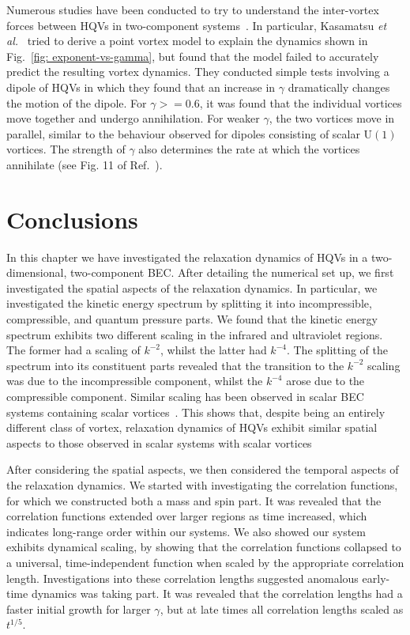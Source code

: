 Numerous studies have been conducted to try to understand the inter-vortex
forces between HQVs in two-component systems~\cite{Eto2011, Kasamatsu2016}.
In particular, Kasamatsu \textit{et al.}~\cite{Kasamatsu2016} tried to derive a
point vortex model to explain the dynamics shown in
Fig.~\ref{fig: exponent-vs-gamma}, but found that the model failed to accurately
predict the resulting vortex dynamics.
They conducted simple tests involving a dipole of HQVs in which they found that
an increase in \(\gamma \) dramatically changes the motion of the dipole.
For \(\gamma>=0.6\), it was found that the individual vortices move together and
undergo annihilation.
For weaker \(\gamma \), the two vortices move in parallel, similar to
the behaviour observed for dipoles consisting of scalar \(\mathrm{U}(1)\)
vortices.
The strength of \(\gamma \) also determines the rate at which the vortices
annihilate (see Fig. 11 of Ref.~\cite{Kasamatsu2016}).

\section{Conclusions}
In this chapter we have investigated the relaxation dynamics of HQVs in a
two-dimensional, two-component BEC\@.
After detailing the numerical set up, we first investigated the spatial aspects
of the relaxation dynamics.
In particular, we investigated the kinetic energy spectrum by splitting it
into incompressible, compressible, and quantum pressure parts.
We found that the kinetic energy spectrum exhibits two different scaling in the
infrared and ultraviolet regions.
The former had a scaling of \(k^{-2}\), whilst the latter had \(k^{-4}\).
The splitting of the spectrum into its constituent parts revealed that the
transition to the \(k^{-2}\) scaling was due to the incompressible component,
whilst the \(k^{-4}\) arose due to the compressible component.
Similar scaling has been observed in scalar BEC systems containing scalar
vortices~\cite{Nowak2012}.
This shows that, despite being an entirely different class of vortex, relaxation
dynamics of HQVs exhibit similar spatial aspects to those observed in scalar
systems with scalar vortices

After considering the spatial aspects, we then considered the temporal aspects
of the relaxation dynamics.
We started with investigating the correlation functions, for which we
constructed both a mass and spin part.
It was revealed that the correlation functions extended over larger regions as
time increased, which indicates long-range order within our systems.
We also showed our system exhibits dynamical scaling, by showing that the
correlation functions collapsed to a universal, time-independent function when
scaled by the appropriate correlation length.
Investigations into these correlation lengths suggested anomalous early-time
dynamics was taking part.
It was revealed that the correlation lengths had a faster initial growth for
larger \(\gamma \), but at late times all correlation lengths scaled as
\(t^{1/5}\).


